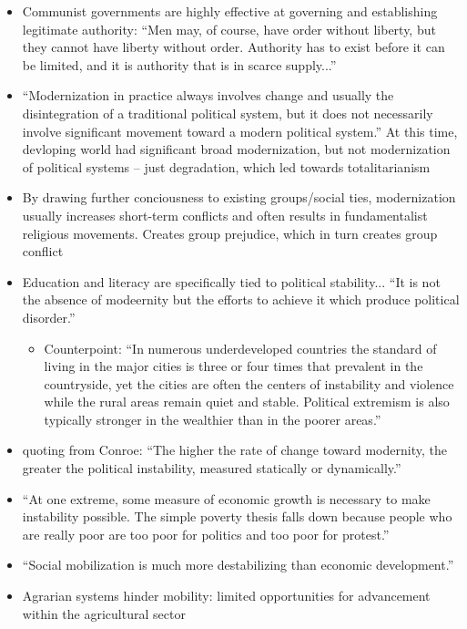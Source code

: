 \documentclass[12pt]{article}
\begin{document}
\begin{itemize}[leftmargin=*, itemsep=4pt]
    \item Communist governments are highly effective at governing and establishing legitimate authority: ``Men may, of course, have order without liberty, but they cannot have liberty without order. Authority has to exist before it can be limited, and it is authority that is in scarce supply...''
    \item ``Modernization in practice always involves change and usually the disintegration of a traditional political system, but it does not necessarily involve significant movement toward a modern political system.'' At this time, devloping world had significant broad modernization, but not modernization of political systems -- just degradation, which led towards totalitarianism
    \item By drawing further conciousness to existing groups/social ties, modernization usually increases short-term conflicts and often results in fundamentalist religious movements. Creates group prejudice, which in turn creates group conflict
    \item Education and literacy are specifically tied to political stability... ``It is not the absence of modeernity but the efforts to achieve it which produce political disorder.''
    \begin{itemize}
        \item Counterpoint: ``In numerous underdeveloped countries the standard of living in the major cities is three or four times that prevalent in the countryside, yet the cities are often the centers of instability and violence while the rural areas remain quiet and stable. Political extremism is also typically stronger in the wealthier than in the poorer areas.''
    \end{itemize}
    \item quoting from Conroe: ``The higher the rate of change toward modernity, the greater the political instability, measured statically or dynamically.''
    \item ``At one extreme, some measure of economic growth is necessary to make instability possible. The simple poverty thesis falls down because people who are really poor are too poor for politics and too poor for protest.''
    \item ``Social mobilization is much more destabilizing than economic development.''
    \item Agrarian systems hinder mobility: limited opportunities for advancement within the agricultural sector

\end{itemize}
\end{document}
